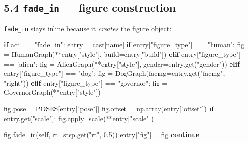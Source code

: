 \documentclass[
  12pt,
  letterpaper,
]{book}
\newenvironment{Shaded}{}{}
\newcommand{\ControlFlowTok}[1]{\textcolor[rgb]{0.00,0.44,0.13}{\textbf{#1}}}
\newcommand{\FloatTok}[1]{\textcolor[rgb]{0.25,0.63,0.44}{#1}}
\newcommand{\NormalTok}[1]{#1}
\newcommand{\OperatorTok}[1]{\textcolor[rgb]{0.40,0.40,0.40}{#1}}
\newcommand{\StringTok}[1]{\textcolor[rgb]{0.25,0.44,0.63}{#1}}
\newcommand{\VariableTok}[1]{\textcolor[rgb]{0.10,0.09,0.49}{#1}}
\begin{document}
\subsection{\texorpdfstring{5.4 \texttt{fade\_in} --- figure
construction}{5.4 fade\_in --- figure construction}}\label{fade_in-figure-construction}

\texttt{fade\_in} stays inline because it \emph{creates} the figure
object:

\begin{Shaded}
\begin{Highlighting}[]
\ControlFlowTok{if}\NormalTok{ act }\OperatorTok{==} \StringTok{"fade\_in"}\NormalTok{:}
\NormalTok{    entry }\OperatorTok{=}\NormalTok{ cast[name]}
    \ControlFlowTok{if}\NormalTok{ entry[}\StringTok{"figure\_type"}\NormalTok{] }\OperatorTok{==} \StringTok{"human"}\NormalTok{:}
\NormalTok{        fig }\OperatorTok{=}\NormalTok{ HumanGraph(}\OperatorTok{**}\NormalTok{entry[}\StringTok{"style"}\NormalTok{], build}\OperatorTok{=}\NormalTok{entry[}\StringTok{"build"}\NormalTok{])}
    \ControlFlowTok{elif}\NormalTok{ entry[}\StringTok{"figure\_type"}\NormalTok{] }\OperatorTok{==} \StringTok{"alien"}\NormalTok{:}
\NormalTok{        fig }\OperatorTok{=}\NormalTok{ AlienGraph(}\OperatorTok{**}\NormalTok{entry[}\StringTok{"style"}\NormalTok{], gender}\OperatorTok{=}\NormalTok{entry.get(}\StringTok{"gender"}\NormalTok{))}
    \ControlFlowTok{elif}\NormalTok{ entry[}\StringTok{"figure\_type"}\NormalTok{] }\OperatorTok{==} \StringTok{"dog"}\NormalTok{:}
\NormalTok{        fig }\OperatorTok{=}\NormalTok{ DogGraph(facing}\OperatorTok{=}\NormalTok{entry.get(}\StringTok{"facing"}\NormalTok{, }\StringTok{"right"}\NormalTok{))}
    \ControlFlowTok{elif}\NormalTok{ entry[}\StringTok{"figure\_type"}\NormalTok{] }\OperatorTok{==} \StringTok{"governor"}\NormalTok{:}
\NormalTok{        fig }\OperatorTok{=}\NormalTok{ GovernorGraph(}\OperatorTok{**}\NormalTok{entry[}\StringTok{"style"}\NormalTok{])}

\NormalTok{    fig.pose }\OperatorTok{=}\NormalTok{ POSES[entry[}\StringTok{"pose"}\NormalTok{]]}
\NormalTok{    fig.offset }\OperatorTok{=}\NormalTok{ np.array(entry[}\StringTok{"offset"}\NormalTok{])}
    \ControlFlowTok{if}\NormalTok{ entry.get(}\StringTok{"scale"}\NormalTok{):}
\NormalTok{        fig.apply\_scale(}\OperatorTok{**}\NormalTok{entry[}\StringTok{"scale"}\NormalTok{])}

\NormalTok{    fig.fade\_in(}\VariableTok{self}\NormalTok{, rt}\OperatorTok{=}\NormalTok{step.get(}\StringTok{"rt"}\NormalTok{, }\FloatTok{0.5}\NormalTok{))}
\NormalTok{    entry[}\StringTok{"fig"}\NormalTok{] }\OperatorTok{=}\NormalTok{ fig}
    \ControlFlowTok{continue}
\end{Highlighting}
\end{Shaded}
\end{document}

